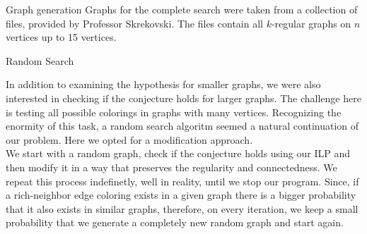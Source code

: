 \documentclass[12pt,a4paper]{amsart}
\makeatletter
\renewcommand\section{\@startsection{section}{1}
  \z@{.5\linespacing\@plus.7\linespacing}{.5\linespacing}
  {\normalfont\scshape\large\centering}}
\renewcommand\subsection{\@startsection{subsection}{2}
  \z@{.5\linespacing\@plus.7\linespacing}{.5\linespacing}
  {\normalfont\scshape}}
\theoremstyle{definition} %
\theoremstyle{plain} %
\makeatother
\begin{document}
    \subsection{Graph generation}
        Graphs for the complete search were taken from a collection of files, provided by Professor Skrekovski. The files contain all $k$-regular graphs on $n$ vertices up to 15 vertices.

\section{Random Search}

    In addition to examining the hypothesis for smaller graphs, we were also interested in checking if the conjecture holds for larger graphs. The challenge here is testing all possible colorings in graphs with many vertices.
    Recognizing the enormity of this task, a random search algoritm seemed a natural continuation of our problem. Here we opted for a modification approach.\\

    We start with a random graph, check if the conjecture holds using our ILP and then modify it in a way that preserves the regularity and connectedness. We repeat this process indefinetly, well in reality, until we stop our program. Since, if a rich-neighbor edge coloring exists in a given graph there is a bigger probability that it also exists in similar graphs, therefore, on every iteration, we keep a small probability that we generate a completely new random graph and start again.\\
\end{document}
